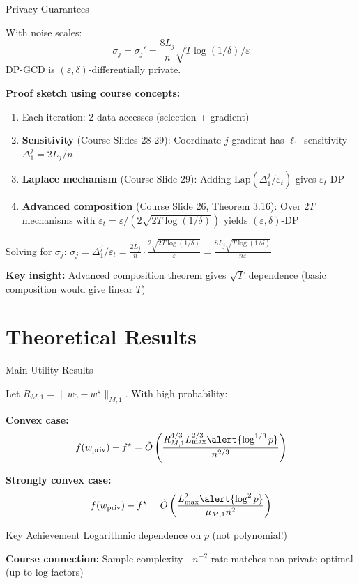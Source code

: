 \documentclass[10pt]{beamer}
\begin{document}
\begin{frame}{Privacy Guarantees}
\begin{theorem}
With noise scales:
\[
\sigma_j = \sigma_j' = \frac{8L_j}{n} \sqrt{T \log(1/\delta)} / \varepsilon
\]
DP-GCD is $(\varepsilon, \delta)$-differentially private.
\end{theorem}

\vspace{0.5em}
\textbf{Proof sketch using course concepts:}
\begin{enumerate}
\item Each iteration: 2 data accesses (selection + gradient)
\item \textbf{Sensitivity} (Course Slides 28-29): Coordinate $j$ gradient has $\ell_1$-sensitivity $\Delta_1^j = 2L_j/n$
\item \textbf{Laplace mechanism} (Course Slide 29): Adding $\text{Lap}(\Delta_1^j/\varepsilon_t)$ gives $\varepsilon_t$-DP
\item \textbf{Advanced composition} (Course Slide 26, Theorem 3.16): Over $2T$ mechanisms with $\varepsilon_t = \varepsilon/(2\sqrt{2T\log(1/\delta)})$ yields $(\varepsilon, \delta)$-DP
\end{enumerate}

\vspace{0.5em}
Solving for $\sigma_j$: $\sigma_j = \Delta_1^j/\varepsilon_t = \frac{2L_j}{n} \cdot \frac{2\sqrt{2T\log(1/\delta)}}{\varepsilon} = \frac{8L_j\sqrt{T\log(1/\delta)}}{n\varepsilon}$

\vspace{0.3em}
\textbf{Key insight:} Advanced composition theorem gives $\sqrt{T}$ dependence (basic composition would give linear $T$)
\end{frame}

\section{Theoretical Results}

\begin{frame}{Main Utility Results}
\begin{theorem}
Let $R_{M,1} = \|w_0 - w^\star\|_{M,1}$. With high probability:

\vspace{0.5em}
\textbf{Convex case:}
\[
f(w_\text{priv}) - f^\star = \tilde{O}\left( \frac{R_{M,1}^{4/3} L_{\max}^{2/3} \alert{\log^{1/3} p}}{n^{2/3}} \right)
\]

\textbf{Strongly convex case:}
\[
f(w_\text{priv}) - f^\star = \tilde{O}\left( \frac{L_{\max}^2 \alert{\log^2 p}}{\mu_{M,1} n^2} \right)
\]
\end{theorem}

\vspace{1em}
\begin{alertblock}{Key Achievement}
\alert{Logarithmic} dependence on $p$ (not polynomial!)
\end{alertblock}

\vspace{0.3em}
\textbf{Course connection:} Sample complexity---$n^{-2}$ rate matches non-private optimal (up to log factors)
\end{frame}
\end{document}
